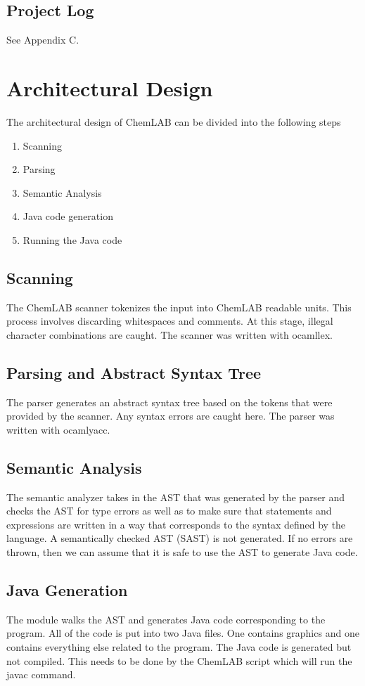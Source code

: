 \documentclass[11pt]{report}
\begin{document}
\section{Project Log}
See Appendix C.

\chapter{Architectural Design}
The architectural design of ChemLAB can be divided into the following steps
\begin{enumerate}
	\item Scanning
	\item Parsing
	\item Semantic Analysis
	\item Java code generation
	\item Running the Java code
\end{enumerate}

\section{Scanning}
The ChemLAB scanner tokenizes the input into ChemLAB readable units. This process involves discarding whitespaces and comments. At this stage, illegal character combinations are caught. The scanner was written with ocamllex. 

\section{Parsing and Abstract Syntax Tree}
The parser generates an abstract syntax tree based on the tokens that were provided by the scanner. Any syntax errors are caught here. The parser was written with ocamlyacc. 

\section{Semantic Analysis}
The semantic analyzer takes in the AST that was generated by the parser and checks the AST for type errors as well as to make sure that statements and expressions are written in a way that corresponds to the syntax defined by the language. A semantically checked AST (SAST) is not generated. If no errors are thrown, then we can assume that it is safe to use the AST to generate Java code. 

\section{Java Generation}
The module walks the AST and generates Java code corresponding to the program. All of the code is put into two Java files. One contains graphics and one contains everything else related to the program. The Java code is generated but not compiled. This needs to be done by the ChemLAB script which will run the javac command. 
\end{document}
